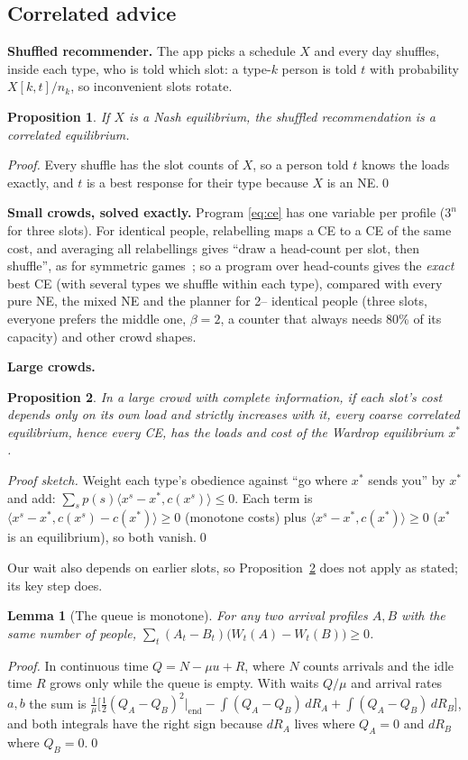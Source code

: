 \documentclass{article}
\newtheorem{proposition}{Proposition}
\newtheorem{lemma}{Lemma}
\begin{document}
\subsection{Correlated advice}
\textbf{Shuffled recommender.} The app picks a schedule $X$ and every day shuffles, inside each type, who is told
which slot: a type-$k$ person is told $t$ with probability $X[k,t]/n_k$, so inconvenient slots rotate.

\begin{proposition}\label{p1}
If $X$ is a Nash equilibrium, the shuffled recommendation is a correlated equilibrium.\end{proposition}
\noindent\emph{Proof.} Every shuffle has the slot counts of $X$, so a person told $t$ knows the loads exactly, and $t$
is a best response for their type because $X$ is an NE.\qed

\smallskip\noindent
\textbf{Small crowds, solved exactly.} Program \eqref{eq:ce} has one variable per profile ($3^n$ for three slots). For
identical people, relabelling maps a CE to a CE of the same cost, and averaging all relabellings gives ``draw a
head-count per slot, then shuffle'', as for symmetric games~\cite{papadimitriou}; so a program over head-counts gives
the \emph{exact} best CE (with several types we shuffle within each type), compared with every pure NE, the mixed
NE and the planner for 2--\RnMax{} identical people (three slots, everyone prefers the middle one, $\beta=2$, a counter
that always needs 80\% of its capacity) and \RshapesN{} other crowd shapes.

\smallskip\noindent\textbf{Large crowds.}
\begin{proposition}\label{p2}
In a large crowd with complete information, if each slot's cost depends only on its own load and strictly increases
with it, every coarse correlated equilibrium, hence every CE, has the loads and cost of the Wardrop equilibrium $x^*$.\end{proposition}
\noindent\emph{Proof sketch.} Weight each type's obedience against ``go where $x^*$ sends you'' by $x^*$ and add:
$\sum_s p(s)\langle x^s-x^*,c(x^s)\rangle\le0$. Each term is $\langle x^s-x^*,c(x^s)-c(x^*)\rangle\ge0$ (monotone
costs) plus $\langle x^s-x^*,c(x^*)\rangle\ge0$ ($x^*$ is an equilibrium), so both vanish.\qed

\smallskip
Our wait also depends on earlier slots, so Proposition~\ref{p2} does not apply as stated; its key step does.

\begin{lemma}[The queue is monotone]\label{lemma}
For any two arrival profiles $A,B$ with the same number of people, $\sum_t(A_t-B_t)\bigl(W_t(A)-W_t(B)\bigr)\ge0$.\end{lemma}
\noindent\emph{Proof.} In continuous time $Q=N-\mu u+R$, where $N$ counts arrivals and the idle time $R$ grows only
while the queue is empty. With waits $Q/\mu$ and arrival rates $a,b$ the sum is
$\frac1\mu\bigl[\tfrac12(Q_A-Q_B)^2\big|_{\text{end}}-\int(Q_A-Q_B)\,dR_A+\int(Q_A-Q_B)\,dR_B\bigr]$, and both integrals
have the right sign because $dR_A$ lives where $Q_A=0$ and $dR_B$ where $Q_B=0$.\qed
\end{document}
